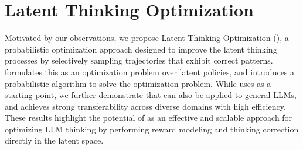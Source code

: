 \documentclass{article} %
\begin{document}
\section{Latent Thinking Optimization}
\label{sec:improve}
Motivated by our observations, we propose Latent Thinking Optimization (\LTO), a probabilistic optimization approach designed to improve the latent thinking processes by selectively sampling trajectories that exhibit correct patterns.
%
\LTO formulates this as an optimization problem over latent policies, and introduces a probabilistic algorithm to solve the optimization problem.
%
While \LTO uses \LRLM as a starting point, we further demonstrate that \LTO can also be applied to general LLMs, and achieves strong transferability across diverse domains with high efficiency. These results highlight the potential of \LTO as an effective and scalable approach for optimizing LLM thinking by performing reward modeling and thinking correction directly in the latent space.
\end{document}
